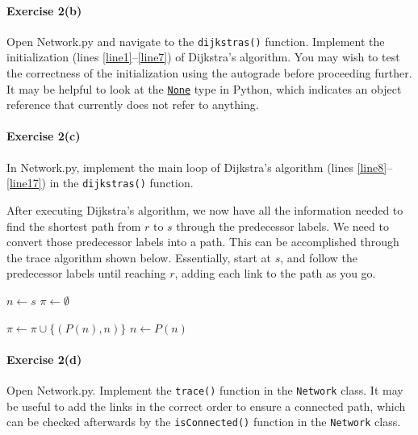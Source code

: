 \documentclass[11pt]{article}
\begin{document}

\paragraph*{Exercise 2(b)} Open Network.py and navigate to the \texttt{dijkstras()} function. Implement the initialization (lines \ref{line1}--\ref{line7}) of Dijkstra's algorithm. 
You may wish to test the correctness of the initialization using the autograde before proceeding further. It may be helpful to look at the \href{https://www.w3schools.com/python/ref_keyword_none.asp}{\texttt{None}} type in Python, which indicates an object reference that currently does not refer to anything. 


\paragraph*{Exercise 2(c)} In Network.py, implement the main loop of Dijkstra's algorithm (lines \ref{line8}--\ref{line17}) in the \texttt{dijkstras()} function. 

\vspace{\baselineskip}

\noindent
After executing Dijkstra's algorithm, we now have all the information needed to find the shortest path from $r$ to $s$ through the predecessor labels. We need to convert those predecessor labels into a path. This can be accomplished through the trace algorithm shown below. Essentially, start at $s$, and follow the predecessor labels until reaching $r$, adding each link to the path as you go. 

\vspace{\baselineskip}

\begin{algorithmic}[1]
	\State $n\leftarrow s$
	\State $\pi \leftarrow \emptyset$
	
	\vspace{0.5\baselineskip}
	
	\State $\pi\leftarrow \pi \cup \{(P(n),n)\}$
	\State $n\leftarrow P(n)$
	\EndWhile
	\EndProcedure
\end{algorithmic}


\paragraph*{Exercise 2(d)} Open Network.py. Implement the \texttt{trace()} function in the \texttt{Network} class. 
It may be useful to add the links in the correct order to ensure a connected path, which can be checked afterwards by the \texttt{isConnected()} function in the \texttt{Network} class.
\end{document}
